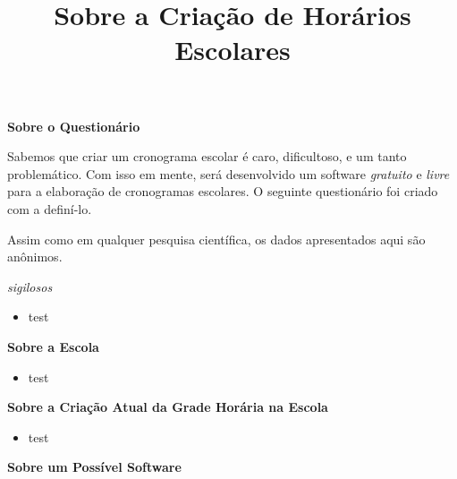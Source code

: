\documentclass[12pt,a4paper]{article}
\title{Sobre a Criação de Horários Escolares}
\begin{document}
		\large{\textbf{Sobre o Questionário}} \\

		\par Sabemos que criar um cronograma escolar é caro, dificultoso, e um tanto problemático.
		Com isso em mente, será desenvolvido um software \textit{gratuito} e \textit{livre} para a
		elaboração de cronogramas escolares. O seguinte questionário foi criado com a definí-lo.

		\par Assim como em qualquer pesquisa científica, os dados apresentados aqui são anônimos.


		\textit{sigilosos}

		\begin{itemize}
			\item test
		\end{itemize}

	\newpage
		\large{\textbf{Sobre a Escola}} \\

		\begin{itemize}
			\item test
		\end{itemize}

	\newpage

		\large{\textbf{Sobre a Criação Atual da Grade Horária na Escola}} \\

		\begin{itemize}
			\item test
		\end{itemize}

	\newpage
		\large{\textbf{Sobre um Possível Software}} \\
\end{document}
